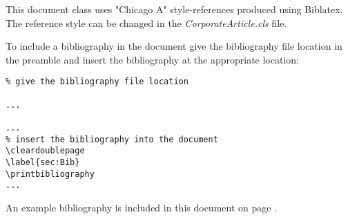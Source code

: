 This document class uses "Chicago A" style-references produced using Biblatex. The reference style can be changed in the \emph{CorporateArticle.cls} file.

To include a bibliography in the document give the bibliography file location in the preamble and insert the bibliography at the appropriate location:

\begin{lstlisting}
% give the bibliography file location

...

...
% insert the bibliography into the document
\cleardoublepage
\label{sec:Bib}
\printbibliography
...

\end{lstlisting}

An example bibliography is included in this document on page \pageref{sec:TheBibliography}.